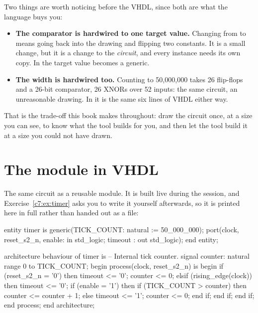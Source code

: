 Two things are worth noticing before the VHDL, since both are what the language buys you:
\begin{itemize}
  \item \textbf{The comparator is hardwired to one target value.} Changing  from
     to  means going back into the drawing and flipping two constants. It is a
    small change, but it is a change to the \emph{circuit}, and every instance needs its own copy.
    In  the target value becomes a generic.
  \item \textbf{The width is hardwired too.} Counting to 50,000,000 takes 26 flip-flops and a 26-bit
    comparator, 26 XNORs over 52 inputs: the same circuit, an unreasonable drawing. In
     it is the same six lines of VHDL either way.
\end{itemize}

That is the trade-off this book makes throughout: draw the circuit once, at a size you can see, to
know what the tool builds for you, and then let the tool build it at a size you could not have
drawn.

\section{The  module in VHDL}
\label{c7:sec:module}

The same circuit as a reusable module. It is built live during the session, and
Exercise~\ref{c7:ex:timer} asks you to write it yourself afterwards, so it is printed here in full
rather than handed out as a file:

\begin{vhdlcode}
entity timer is
    generic(TICK_COUNT: natural := 50_000_000);
    port(clock, reset_s2_n, enable: in std_logic;
         timeout                  : out std_logic);
end entity;

architecture behaviour of timer is
-- Internal tick counter.
signal counter: natural range 0 to TICK_COUNT;
begin
    process(clock, reset_s2_n) is
    begin
        if (reset_s2_n = '0') then
            timeout <= '0';
            counter <= 0;
        elsif (rising_edge(clock)) then
            timeout <= '0';
            if (enable = '1') then
                if (TICK_COUNT > counter) then
                    counter <= counter + 1;
                else
                    timeout <= '1';
                    counter <= 0;
                end if;
            end if;
        end if;
    end process;
end architecture;
\end{vhdlcode}

